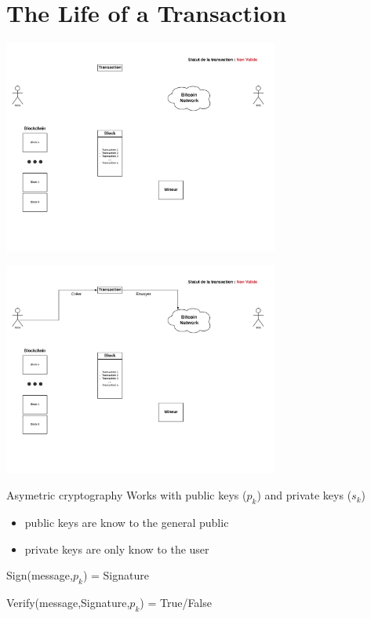 \documentclass{beamer}
\begin{document}
\section{The Life of a Transaction}

\begin{frame}
    \begin{center}
        \includegraphics[height=7cm]{images/explanation-0.png}
    \end{center}
\end{frame}

\begin{frame}
    \begin{center}
        \includegraphics[height=7cm]{images/explanation-2.png}
    \end{center}
\end{frame}

\begin{frame}
    \begin{block}{Asymetric cryptography}
        Works with public keys ($p_k$) and private keys ($s_k$)
        \pause
        \begin{itemize}
            \item public keys are know to the general public
            \item private keys are only know to the user
                \pause
        \end{itemize}
        Sign(message,$p_k$) = Signature

        \pause
        Verify(message,Signature,$p_k$) = True/False
    \end{block}
\end{frame}
\end{document}
